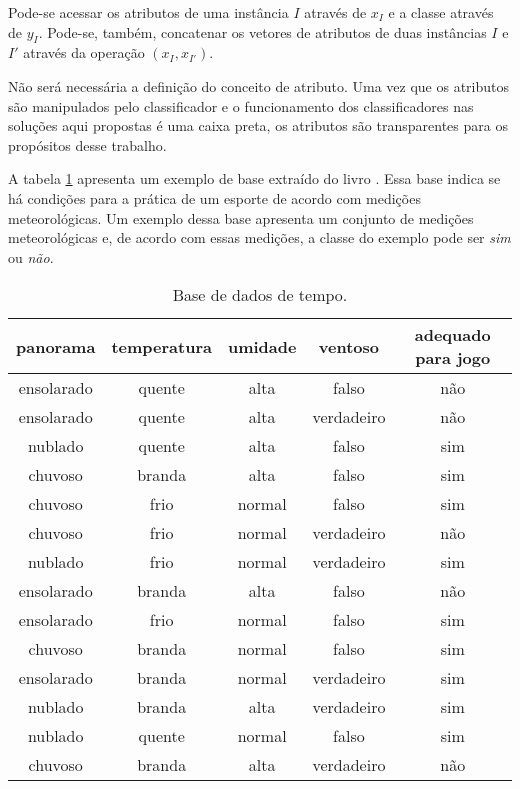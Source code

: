 Pode-se acessar os atributos de uma instância $I$ através de $x_I$ e a classe através de $y_I$. Pode-se, também, concatenar os vetores de atributos de duas instâncias $I$ e $I'$ através da operação $(x_I, x_{I'})$.

Não será necessária a definição do conceito de atributo. Uma vez que os atributos são manipulados pelo classificador e o funcionamento dos classificadores nas soluções aqui propostas é uma caixa preta, os atributos são transparentes para os propósitos desse trabalho.

A tabela \ref{tab:weather} apresenta um exemplo de base extraído do livro \cite{wekabook}. Essa base indica se há condições para a prática de um esporte de acordo com medições meteorológicas. Um exemplo dessa base apresenta um conjunto de medições meteorológicas e, de acordo com essas medições, a classe do exemplo pode ser \emph{sim} ou \emph{não}.

\begin{table}[h!]
    \centering
    \begin{tabular}{ccccc}
        \hline
        panorama & temperatura & umidade & ventoso & adequado para jogo \\
        \hline
        ensolarado & quente & alta & falso & não \\
        ensolarado & quente & alta & verdadeiro & não \\
        nublado & quente & alta & falso & sim \\
        chuvoso & branda & alta & falso & sim \\
        chuvoso & frio & normal & falso & sim \\
        chuvoso & frio & normal & verdadeiro & não \\
        nublado & frio & normal & verdadeiro & sim \\
        ensolarado & branda & alta & falso & não \\
        ensolarado & frio & normal & falso & sim \\
        chuvoso & branda & normal & falso & sim \\
        ensolarado & branda & normal & verdadeiro & sim \\
        nublado & branda & alta & verdadeiro & sim \\
        nublado & quente & normal & falso & sim \\
        chuvoso & branda & alta & verdadeiro & não \\
        \hline
    \end{tabular}

    \caption{Base de dados de tempo. \label{tab:weather}}
\end{table}


